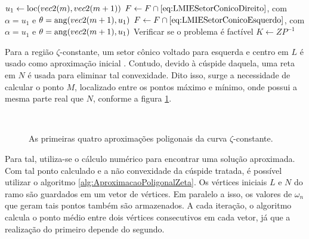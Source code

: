 \begin{algorithm}[ht!]
\begin{algorithmic}[1]
          \State $u_1 \gets \operatorname{loc}(vec2(m),vec2(m+1))$
            \State $F\gets F \cap \eqref{eq:LMIESetorConicoDireito}$, com $\alpha = u_1$ e $\theta = \operatorname{ang}(vec2(m+1),u_1)$ 
          \Else
            \State $F\gets F \cap \eqref{eq:LMIESetorConicoEsquerdo}$, com $\alpha = u_1$ e $\theta = \operatorname{ang}(vec2(m+1),u_1)$ 
          \EndIf
        \EndFor
        \State Verificar se o problema é factível 
    \EndWhile
    \State $K \gets ZP^{-1}$
  \end{algorithmic}
\end{algorithm}

Para a região $\zeta$-constante, um setor cônico voltado para esquerda e centro em $L$ é usado como aproximação inicial \cite{WISNIEWSKI2019}. Contudo, devido à cúspide daquela, uma reta em $N$ é usada para eliminar tal convexidade. Dito isso, surge a necessidade de calcular o ponto $M$, localizado entre os pontos máximo e mínimo, onde possui a mesma parte real que $N$, conforme a figura \ref{subfig:AproximacaoPoligonalZeta1}.

\begin{figure}[!ht]
  \centering
  \begin{subfigure}[t]{0.4\columnwidth}
      
      \caption{}
      \label{subfig:AproximacaoPoligonalZeta1}
  \end{subfigure}
  \begin{subfigure}[t]{0.4\columnwidth}
      
      \caption{}
      \label{subfig:AproximacaoPoligonalZeta2}
  \end{subfigure}
  \\
  \begin{subfigure}[t]{0.4\columnwidth}
    
    \caption{}
    \label{subfig:AproximacaoPoligonalZeta3}
  \end{subfigure}
  \begin{subfigure}[t]{0.4\columnwidth}
    
    \caption{}
    \label{subfig:AproximacaoPoligonalZeta4}
  \end{subfigure}
  \caption{As primeiras quatro aproximações poligonais da curva $\zeta$-constante.}
  \label{fig:AproximacoesPoligonalZeta}
\end{figure}

Para tal, utiliza-se o cálculo numérico para encontrar uma solução aproximada. Com tal ponto calculado e a não convexidade da cúspide tratada, é possível utilizar o algoritmo \ref{alg:AproximacaoPoligonalZeta}. Os vértices iniciais $L$ e $N$ do ramo são guardados em um vetor de vértices. Em paralelo a isso, os valores de $\omega_n$ que geram tais pontos também são armazenados. A cada iteração, o algoritmo calcula o ponto médio entre dois vértices consecutivos em cada vetor, já que a realização do primeiro depende do segundo.

